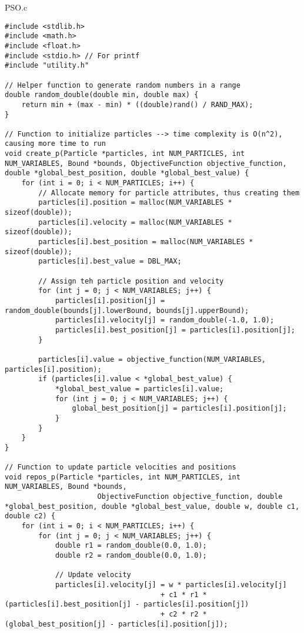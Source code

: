 \documentclass[12pt]{article}
\begin{document}
PSO.c
	
	\begin{lstlisting}[basicstyle=\small]
		#include <stdlib.h>
#include <math.h>
#include <float.h>
#include <stdio.h> // For printf
#include "utility.h"

// Helper function to generate random numbers in a range
double random_double(double min, double max) {
    return min + (max - min) * ((double)rand() / RAND_MAX);
}

// Function to initialize particles --> time complexity is O(n^2), causing more time to run
void create_p(Particle *particles, int NUM_PARTICLES, int NUM_VARIABLES, Bound *bounds, ObjectiveFunction objective_function, double *global_best_position, double *global_best_value) {
    for (int i = 0; i < NUM_PARTICLES; i++) {
        // Allocate memory for particle attributes, thus creating them
        particles[i].position = malloc(NUM_VARIABLES * sizeof(double));
        particles[i].velocity = malloc(NUM_VARIABLES * sizeof(double));
        particles[i].best_position = malloc(NUM_VARIABLES * sizeof(double));
        particles[i].best_value = DBL_MAX;

        // Assign teh particle position and velocity
        for (int j = 0; j < NUM_VARIABLES; j++) {
            particles[i].position[j] = random_double(bounds[j].lowerBound, bounds[j].upperBound);
            particles[i].velocity[j] = random_double(-1.0, 1.0);
            particles[i].best_position[j] = particles[i].position[j];
        }

        particles[i].value = objective_function(NUM_VARIABLES, particles[i].position);
        if (particles[i].value < *global_best_value) {
            *global_best_value = particles[i].value;
            for (int j = 0; j < NUM_VARIABLES; j++) {
                global_best_position[j] = particles[i].position[j];
            }
        }
    }
}

// Function to update particle velocities and positions
void repos_p(Particle *particles, int NUM_PARTICLES, int NUM_VARIABLES, Bound *bounds,
                      ObjectiveFunction objective_function, double *global_best_position, double *global_best_value, double w, double c1, double c2) {
    for (int i = 0; i < NUM_PARTICLES; i++) {
        for (int j = 0; j < NUM_VARIABLES; j++) {
            double r1 = random_double(0.0, 1.0);
            double r2 = random_double(0.0, 1.0);

            // Update velocity
            particles[i].velocity[j] = w * particles[i].velocity[j]
                                     + c1 * r1 * (particles[i].best_position[j] - particles[i].position[j])
                                     + c2 * r2 * (global_best_position[j] - particles[i].position[j]);


\end{lstlisting}
\end{document}

